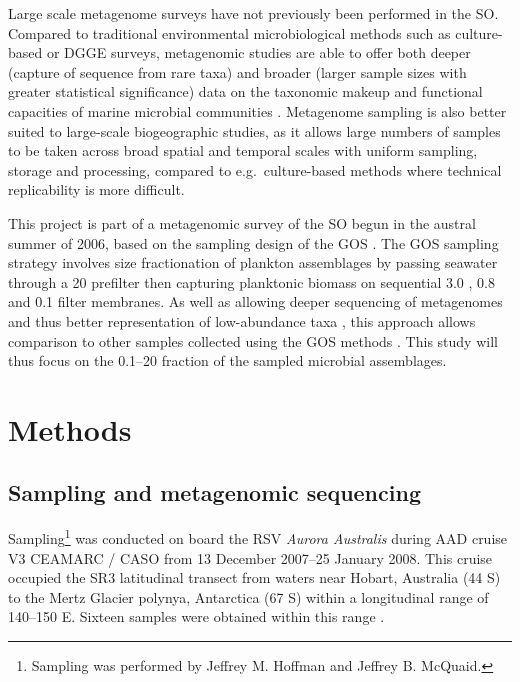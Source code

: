 Large scale metagenome surveys have not previously been performed in the \ac{SO}.
Compared to traditional environmental microbiological methods such as culture-based or DGGE surveys, metagenomic studies are able to offer both deeper (capture of sequence from rare taxa) and broader (larger sample sizes with greater statistical significance) data on the taxonomic makeup and functional capacities of marine microbial communities \citep[e.g.][]{Rusch:2007ez,Angly:2006wf,Dinsdale:2008cd}.
Metagenome sampling is also better suited to large-scale biogeographic studies, as it allows large numbers of samples to be taken across broad spatial and temporal scales with uniform sampling, storage and processing, compared to e.g.\ culture-based methods where technical replicability is more difficult.

This project is part of a metagenomic survey of the \ac{SO} begun in the austral summer of 2006, based on the sampling design of the \ac{GOS} \cite{Rusch:2007ez}.
The \ac{GOS} sampling strategy involves size fractionation of plankton assemblages by passing seawater through a 20 \micron{} prefilter then capturing planktonic biomass on sequential 3.0 \micron{}, 0.8 \micron{} and 0.1 \micron{} filter membranes.
As well as allowing deeper sequencing of metagenomes and thus better representation of low-abundance taxa \cite{Rusch:2007ez}, this approach allows comparison to other samples collected using the \ac{GOS} methods \citep[e.g.][]{Brown:2012gna}.
This study will thus focus on the 0.1--20 \micron{} fraction of the sampled microbial assemblages.

\section{Methods}
\subsection{Sampling and metagenomic sequencing}

Sampling\footnote{Sampling was performed by Jeffrey M. Hoffman and Jeffrey B. McQuaid.} was conducted on board the RSV \emph{Aurora Australis} during \ac{AAD} cruise V3 \ac{CEAMARC} / \ac{CASO} from 13 December 2007--25 January 2008. 
This cruise occupied the SR3 latitudinal transect from waters near Hobart, Australia (\textapprox{}44\textdegree{} S) to the Mertz Glacier polynya, Antarctica (\textapprox{}67\textdegree{} S) within a longitudinal range of \textapprox{}140--150\textdegree{} E.
Sixteen samples were obtained within this range .


